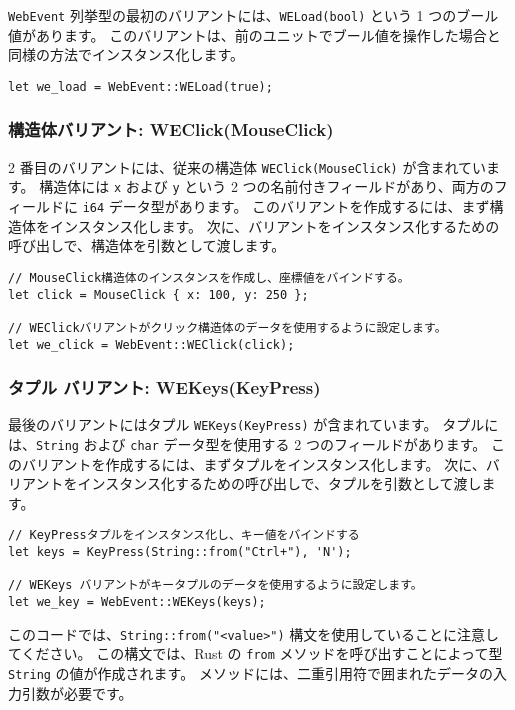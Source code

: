 \texttt{WebEvent} 列挙型の最初のバリアントには、\texttt{WELoad(bool)} という 1 つのブール値があります。 このバリアントは、前のユニットでブール値を操作した場合と同様の方法でインスタンス化します。

\begin{lstlisting}[numbers=none]
let we_load = WebEvent::WELoad(true);
\end{lstlisting}

\subsubsection{構造体バリアント: WEClick(MouseClick)}

2 番目のバリアントには、従来の構造体 \texttt{WEClick(MouseClick)} が含まれています。 構造体には \texttt{x} および \texttt{y} という 2 つの名前付きフィールドがあり、両方のフィールドに \texttt{i64} データ型があります。 このバリアントを作成するには、まず構造体をインスタンス化します。 次に、バリアントをインスタンス化するための呼び出しで、構造体を引数として渡します。

\begin{lstlisting}[numbers=none]
// MouseClick構造体のインスタンスを作成し、座標値をバインドする。
let click = MouseClick { x: 100, y: 250 };

// WEClickバリアントがクリック構造体のデータを使用するように設定します。
let we_click = WebEvent::WEClick(click);
\end{lstlisting}

\subsubsection{タプル バリアント: WEKeys(KeyPress)}

最後のバリアントにはタプル \texttt{WEKeys(KeyPress)} が含まれています。 タプルには、\texttt{String} および \texttt{char} データ型を使用する 2 つのフィールドがあります。 このバリアントを作成するには、まずタプルをインスタンス化します。 次に、バリアントをインスタンス化するための呼び出しで、タプルを引数として渡します。

\begin{lstlisting}[numbers=none]
// KeyPressタプルをインスタンス化し、キー値をバインドする
let keys = KeyPress(String::from("Ctrl+"), 'N');
    
// WEKeys バリアントがキータプルのデータを使用するように設定します。
let we_key = WebEvent::WEKeys(keys);
\end{lstlisting}

このコードでは、\texttt{String::from("<value>")} 構文を使用していることに注意してください。 この構文では、Rust の \texttt{from} メソッドを呼び出すことによって型 \texttt{String} の値が作成されます。 メソッドには、二重引用符で囲まれたデータの入力引数が必要です。

